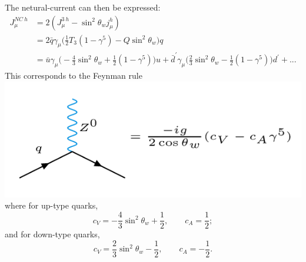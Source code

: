 \documentclass[a4paper,12pt]{article}
\begin{document}
The netural-current can then be expressed:
\begin{equation}
\begin{split}
J_\mu^{NC\ h} &= 2 (J_\mu^{3\ h} - \sin^2\theta_w j_\mu^h) \\
&= 2 \bar{q} \gamma_\mu \bigg(\frac{1}{2} T_3 (1-\gamma^5) - Q \sin^2\theta_w \bigg) q \\
&= \bar{u} \gamma_\mu \bigg( -\frac{4}{3}\sin^2\theta_w + \frac{1}{2}(1-\gamma^5)\bigg) u + \bar{d}^\prime \gamma_\mu \bigg(\frac{2}{3} \sin^2\theta_w - \frac{1}{2}(1 - \gamma^5) \bigg) d^\prime + ...
\end{split}
\end{equation}
This corresponds to the Feynman rule
\newline
  \includegraphics[width=0.7\linewidth]{figs/27a.png}
\newline
where for up-type quarks,
\begin{equation}
c_V = -\frac{4}{3}\sin^2\theta_w + \frac{1}{2}, \qquad c_A = \frac{1}{2};
\end{equation}
and for down-type quarks,
\begin{equation}
c_V = \frac{2}{3}\sin^2\theta_w - \frac{1}{2}, \qquad c_A = -\frac{1}{2}.
\end{equation}
%
\end{document}
